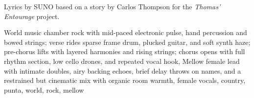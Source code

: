 
\begin{notes}
Lyrics by SUNO based on a story by Carlos Thompson for the \emph{Thomas’ Entourage} project.
\end{notes}
\begin{style}
World music chamber rock with mid-paced electronic pulse, hand percussion and bowed strings; verse rides sparse frame drum, plucked guitar, and soft synth haze; pre-chorus lifts with layered harmonies and rising strings; chorus opens with full rhythm section, low cello drones, and repeated vocal hook, Mellow female lead with intimate doubles, airy backing echoes, brief delay throws on names, and a restrained but cinematic mix with organic room warmth, female vocals, country, punta, world, rock, mellow
\end{style}
